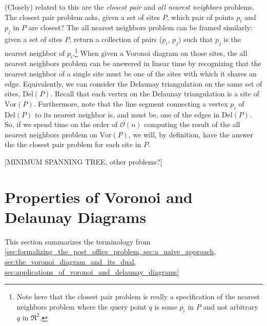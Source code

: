 \documentclass[12pt,twoside]{reedthesis}
\begin{document}
  (Closely) related to this are the \emph{closest pair} and \emph{all nearest neighbors} problems. The closest pair problem asks, given a set of sites $P$, which pair of points $p_{i}$ and $p_{j}$ in $P$ are closest? The all nearest neighbors problem can be framed similarly: given a set of sites $P$, return a collection of pairs ($p_{i}$, $p_{j}$) such that $p_{j}$ is the nearest neighbor of $p_{i}$.\footnote{Note here that the closest pair problem is really a specification of the nearest neighbors problem where the query point $q$ is some $p_{i}$ in $P$ and not arbitrary $q$ in $\Re^2$.} When given a Voronoi diagram on those sites, the all nearest neighbors problem can be answered in linear time by recognizing that the nearest neighbor of a single site must be one of the sites with which it shares an edge. Equivalently, we can consider the Delaunay triangulation on the same set of sites, $\mbox{Del}(P)$. Recall that each vertex on the Delaunay triangulation is a site of $\mbox{Vor}(P)$. Furthermore, note that the line segment connecting a vertex $p_{i}$ of $\mbox{Del}(P)$ to its nearest neighbor is, and must be, one of the edges in $\mbox{Del}(P)$. So, if we spend time on the order of $\mathcal{O}(n)$ computing the result of the all nearest neighbors problem on $\mbox{Vor}(P)$, we will, by definition, have the answer the the closest pair problem for each site in $P$. 

  [MINIMUM SPANNING TREE, other problems?]
  
  \section{Properties of Voronoi and Delaunay Diagrams} %
  \label{sec:properties_of_voronoi_and_delaunay_diagrams}
  This section summarizes the terminology from \cref{sec:formalizing_the_post_office_problem, sec:a_naive_approach, sec:the_voronoi_diagram_and_its_dual, sec:applications_of_voronoi_and_delaunay_diagrams} 
  

\end{document}
